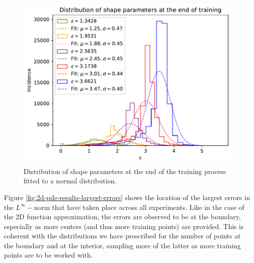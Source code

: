 \documentclass[12pt]{report} %
\begin{document}
\begin{figure}[h]
  \includegraphics[width=.8\textwidth]{imagenes/experiments/2d/pde_parabola/distribution_of_shape_parameters_at_end_of_training.pdf}
  \caption{Distribution of shape parameters at the end of the training process fitted to a normal distribution.}
  \label{fig:2d-pde-results-shape-parameters}
\end{figure}

Figure \ref{fig:2d-pde-results-largest-errors} shows the location of the largest errors in the $L^\infty-$norm that have taken place across all experiments. Like in the case of the 2D function approximation, the errors are observed to be at the boundary, especially as more centers (and thus more training points) are provided. This is coherent with the distributions we have prescribed for the number of points at the boundary and at the interior, sampling more of the latter as more training points are to be worked with.
\end{document}

